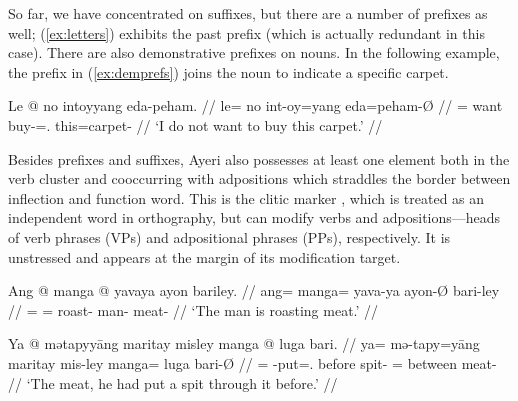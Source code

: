So far, we have concentrated on suffixes, but there are a number of 
prefixes as well; (\ref{ex:letters}) exhibits the past prefix 
 (which is actually redundant in this case). There are also 
demonstrative prefixes on nouns. In the following example, the prefix 
 in (\ref{ex:demprefs}) joins the noun
 to indicate a specific carpet.

\ex\label{ex:demprefs}%
\begingl
	\gla Le @ no intoyyang eda-peham. //
	\glb le= no int-oy=yang eda=peham-Ø //
	\glc \PatTI{}= want buy-\Neg{}=\Fsg{}.\Aarg{} this=carpet-\Top{} //
	\glft `I do not want to buy this carpet.' //
\endgl\xe

Besides prefixes and suffixes, Ayeri also possesses at least one element both
in the verb cluster and cooccurring with adpositions which straddles the
border between inflection and function word. This is the clitic
marker , which is treated as an independent word in
orthography, but can modify verbs and adpositions---heads of verb phrases (VPs)
and adpositional phrases (PPs), re\-spec\-tive\-ly. It is unstressed and
appears at the margin of its modification target.

\pex
\a\label{ex:prog}\begingl
	\gla Ang @ manga @ yavaya ayon bariley. //
	\glb ang= manga= yava-ya ayon-Ø bari-ley //
	\glc \AgtT{}= \Prog{}= roast-\TsgM{} man-\Top{} meat-\PargI{} //
	\glft `The man is roasting meat.' //
\endgl

\a\label{ex:dyn}\begingl
	\gla Ya @ mətapyyāng maritay misley manga @ luga bari. //
	\glb ya= mə-tapy=yāng maritay mis-ley manga= luga bari-Ø //
	\glc \LocT{}= \Pst{}-put=\TsgM{}.\Aarg{} before spit-\PargI{} \Dir{}= 
		between meat-\Top{} //
	\glft `The meat, he had put a spit through it before.' //
\endgl
\xe

